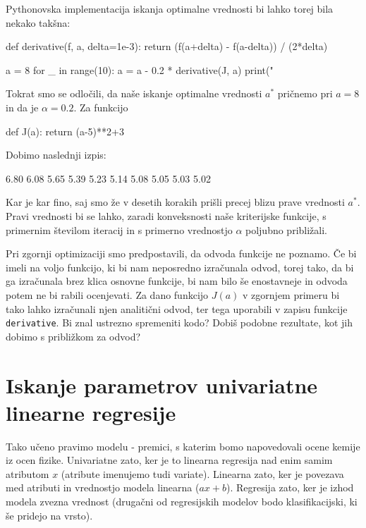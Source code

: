 Pythonovska implementacija iskanja optimalne vrednosti bi lahko torej
bila nekako takšna:

\begin{python}
def derivative(f, a, delta=1e-3):
    return (f(a+delta) - f(a-delta)) / (2*delta)

a = 8
for _ in range(10):
    a = a - 0.2 * derivative(J, a)
    print("%
\end{python}

Tokrat smo se odločili, da naše iskanje optimalne vrednosti $a^*$
pričnemo pri $a=8$ in da je $\alpha=0.2$. Za funkcijo

\begin{python}
def J(a):
    return (a-5)**2+3
\end{python}

Dobimo naslednji izpis:

\begin{python}
6.80
6.08
5.65
5.39
5.23
5.14
5.08
5.05
5.03
5.02
\end{python}

Kar je kar fino, saj smo že v desetih korakih prišli precej blizu
prave vrednosti $a^*$. Pravi vrednosti bi se lahko, zaradi
konveksnosti naše kriterijske funkcije, s primernim številom
iteracij in s primerno vrednostjo $\alpha$ poljubno približali.

Pri zgornji optimizaciji smo predpostavili, da odvoda funkcije ne
poznamo. Če bi imeli na voljo funkcijo, ki bi nam neposredno
izračunala odvod, torej tako, da bi ga izračunala brez klica osnovne
funkcije, bi nam bilo še enostavneje in odvoda potem ne bi rabili
ocenjevati. Za dano funkcijo $J(a)$ v zgornjem primeru bi tako lahko
izračunali njen analitični odvod, ter tega uporabili v zapisu funkcije
{\tt derivative}. Bi znal ustrezno spremeniti kodo? Dobiš podobne
rezultate, kot jih dobimo s približkom za odvod?

\section{Iskanje parametrov univariatne linearne regresije}

Tako učeno pravimo modelu - premici, s katerim bomo napovedovali ocene
kemije iz ocen fizike. Univariatne zato, ker je to linearna regresija
nad enim samim atributom $x$ (atribute imenujemo tudi
variate). Linearna zato, ker je povezava med atributi in vrednostjo
modela linearna ($a x + b$). Regresija zato, ker je izhod modela
zvezna vrednost (drugačni od regresijskih modelov bodo
klasifikacijski, ki še pridejo na vrsto).

